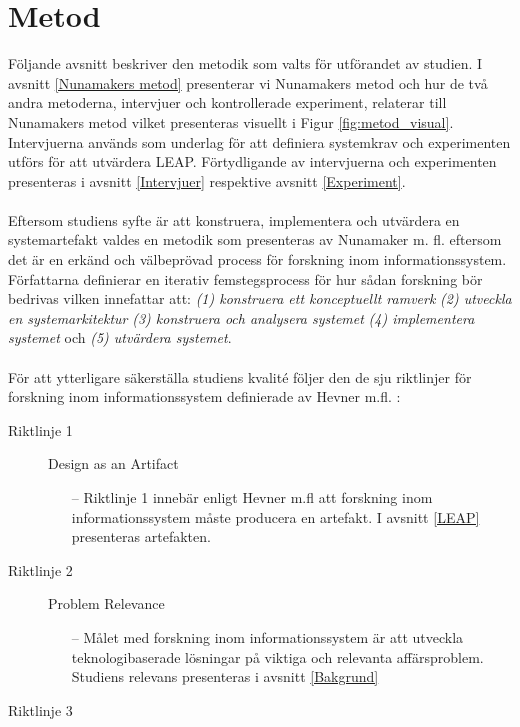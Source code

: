 \documentclass[a4paper,11pt]{article}
\begin{document}
{\newpage
\section{Metod}\label{Metod}

Följande avsnitt beskriver den metodik som valts för utförandet av studien. I avsnitt \ref{Nunamakers metod} presenterar vi Nunamakers metod och hur de två andra metoderna, intervjuer och kontrollerade experiment, relaterar till Nunamakers metod vilket presenteras visuellt i Figur \ref{fig:metod_visual}. Intervjuerna används som underlag för att definiera systemkrav och experimenten utförs för att utvärdera LEAP. Förtydligande av intervjuerna och experimenten presenteras i avsnitt \ref{Intervjuer} respektive avsnitt \ref{Experiment}.
\\
\\
Eftersom studiens syfte är att konstruera, implementera och utvärdera en systemartefakt valdes en metodik som presenteras av Nunamaker m. fl. \cite{nunamaker} eftersom det är en erkänd och välbeprövad process för forskning inom informationssystem. Författarna definierar en iterativ femstegsprocess för hur sådan forskning bör bedrivas vilken innefattar att: \textit{(1) konstruera ett konceptuellt ramverk} \textit{(2) utveckla en systemarkitektur} \textit{(3) konstruera och analysera systemet} \textit{(4) implementera systemet} och \textit{(5) utvärdera systemet}. 
\\
\\
För att ytterligare säkerställa studiens kvalité följer den de sju riktlinjer för forskning inom informationssystem definierade av Hevner m.fl. \cite{hevner}:
\begin{description}
    \item [Riktlinje 1]
    Design as an Artifact
    \begin{itemize}
    \item [--] Riktlinje 1 innebär enligt Hevner m.fl att forskning inom informationssystem måste producera en artefakt. I avsnitt \ref{LEAP} presenteras artefakten.
    \end{itemize}
    \item [Riktlinje 2]
    Problem Relevance
     \begin{itemize}
    \item [--] Målet med forskning inom informationssystem är att utveckla teknologibaserade lösningar på viktiga och relevanta affärsproblem. Studiens relevans presenteras i avsnitt \ref{Bakgrund}
    \end{itemize}
    \item [Riktlinje 3]

\end{description}}
\end{document}
